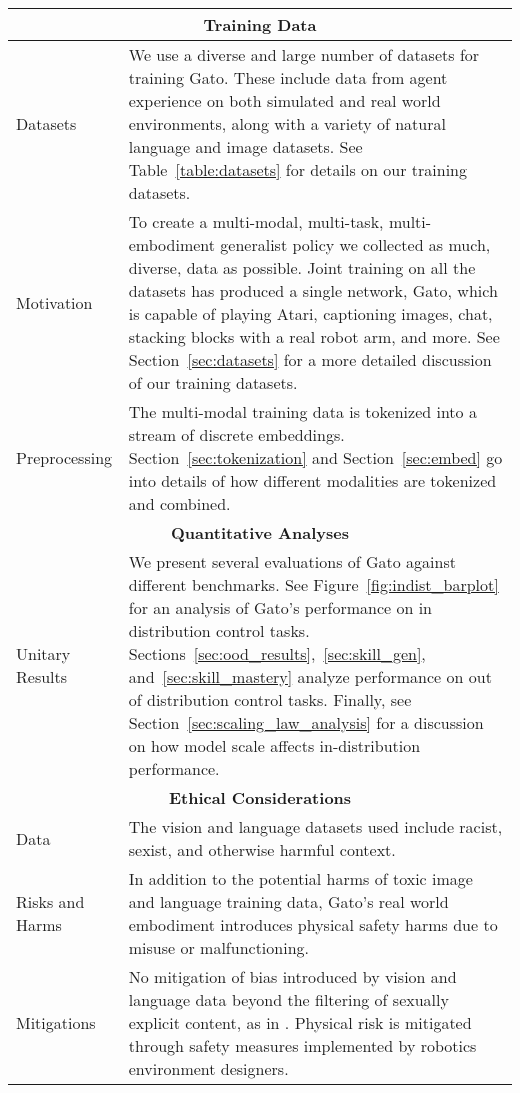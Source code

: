 \documentclass[10pt]{article} \usepackage[accepted]{tmlr}
\newcommand{\model}{{Gato}}
\begin{document}
\begin{longtable}{p{}|p{}}
\toprule
\multicolumn{2}{c}{\textbf{Training Data}}\\
\midrule
Datasets      & We use a diverse and large number of datasets for training \model{}. These include data from agent experience on both simulated and real world environments, along with a variety of natural language and image datasets.
See Table~\ref{table:datasets} for details on our training datasets. \\
\midrule
Motivation    & To create a multi-modal, multi-task, multi-embodiment generalist policy we collected as much, diverse, data
as possible. Joint training on all the datasets has produced a single network, \model{}, which is capable of playing Atari,
captioning images, chat, stacking blocks with a real robot arm, and more.
See Section~\ref{sec:datasets} for a more detailed discussion of our training datasets. \\
\midrule
Preprocessing & The multi-modal training data is tokenized into a stream of discrete embeddings. 
Section~\ref{sec:tokenization} and Section~\ref{sec:embed} go into details of how different modalities are tokenized and combined. \\

\toprule
\multicolumn{2}{c}{\textbf{Quantitative Analyses}}\\
\midrule
Unitary Results & We present several evaluations of \model{} against different benchmarks.
See Figure~\ref{fig:indist_barplot} for an analysis of \model{}'s performance on in distribution control tasks.
Sections~\ref{sec:ood_results},~\ref{sec:skill_gen}, and~\ref{sec:skill_mastery} analyze performance on out of distribution control tasks.
Finally, see Section~\ref{sec:scaling_law_analysis} for a discussion on how model scale affects in-distribution performance. \\


\toprule
\multicolumn{2}{c}{\textbf{Ethical Considerations}}\\
\midrule
Data            & The vision and language datasets used include racist, sexist, and otherwise harmful context.  \\
\midrule
Risks and Harms & In addition to the potential harms of toxic image and language training data, \model{}'s real world embodiment introduces physical safety harms due to misuse or malfunctioning. \\

\midrule
Mitigations     & No mitigation of bias introduced by vision and language data beyond the filtering of sexually explicit content, as in \cite{Alayrac2022FlamingoAV}. Physical risk is mitigated through safety measures implemented by robotics environment designers. \\


\end{longtable}
\end{document}
